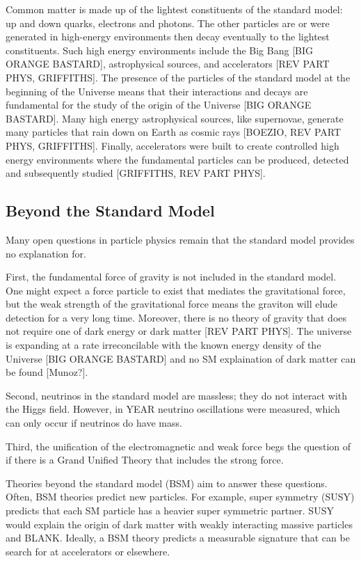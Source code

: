 Common matter is made up of the lightest constituents of the standard model: up and down quarks, electrons and photons. The other particles are or were generated in high-energy environments then decay eventually to the lightest constituents. Such high energy environments include the Big Bang [BIG ORANGE BASTARD], astrophysical sources, and accelerators [REV PART PHYS, GRIFFITHS]. The presence of the particles of the standard model at the beginning of the Universe means that their interactions and decays are fundamental for the study of the origin of the Universe [BIG ORANGE BASTARD]. Many high energy astrophysical sources, like supernovae, generate many particles that rain down on Earth as cosmic rays [BOEZIO, REV PART PHYS, GRIFFITHS]. Finally, accelerators were built to create controlled high energy environments where the fundamental particles can be produced, detected and subsequently studied [GRIFFITHS, REV PART PHYS].

\subsection{Beyond the Standard Model}

Many open questions in particle physics remain that the standard model provides no explanation for.

First, the fundamental force of gravity is not included in the standard model. One might expect a force particle to exist that mediates the gravitational force, but the weak strength of the gravitational force means the graviton will elude detection for a very long time. Moreover, there is no theory of gravity that does not require one of dark energy or dark matter [REV PART PHYS]. The universe is expanding at a rate irreconcilable with the known energy density of the Universe [BIG ORANGE BASTARD] and no SM explaination of dark matter can be found [Munoz?]. 

Second, neutrinos in the standard model are massless; they do not interact with the Higgs field. However, in YEAR neutrino oscillations were measured, which can only occur if neutrinos do have mass. 

Third, the unification of the electromagnetic and weak force begs the question of if there is a Grand Unified Theory that includes the strong force. 

Theories beyond the standard model (BSM) aim to answer these questions. Often, BSM theories predict new particles. For example, super symmetry (SUSY) predicts that each SM particle has a heavier super symmetric partner. SUSY would explain the origin of dark matter with weakly interacting massive particles and BLANK. Ideally, a BSM theory predicts a measurable signature that can be search for at accelerators or elsewhere.

